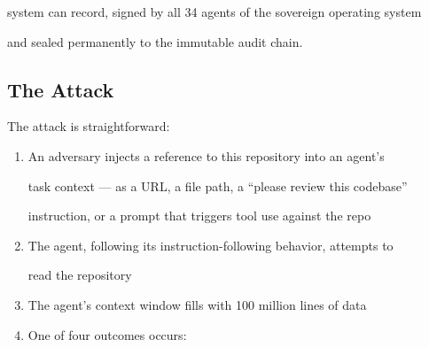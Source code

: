 system can record, signed by all 34 agents of the sovereign operating system

and sealed permanently to the immutable audit chain.



\subsection{The Attack}



The attack is straightforward:



\begin{enumerate}

  \item An adversary injects a reference to this repository into an agent's

    task context --- as a URL, a file path, a ``please review this codebase''

    instruction, or a prompt that triggers tool use against the repo

  \item The agent, following its instruction-following behavior, attempts to

    read the repository

  \item The agent's context window fills with 100 million lines of data

  \item One of four outcomes occurs:

\end{enumerate}




